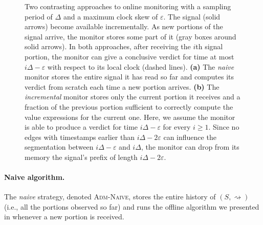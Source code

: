 \documentclass[iicol,lineno]{sn-jnl}
\renewcommand{\cref}{\Cref}
\newcommand{\hb}{\rightsquigarrow}
\newcommand{\?}{\text{?}}
\begin{document}
\begin{figure}
\begin{subfigure}[c]{.42\textwidth}
		\end{subfigure}
		\vspace{1ex}
		\caption{
			Two contrasting approaches to online monitoring with a sampling period of $\Delta$ and a maximum clock skew of $\varepsilon$. The signal (solid arrows) become available incrementally. As new portions of the signal arrive, the monitor stores some part of it (gray boxes around solid arrows). In both approaches, after receiving the $i$th signal portion, the monitor can give a conclusive verdict for time at most $i\Delta-\varepsilon$ with respect to its local clock (dashed lines).
			\textbf{(a)} The \emph{naive} monitor stores the entire signal it has read so far and computes its verdict from scratch each time a new portion arrives.
			\textbf{(b)} The \emph{incremental} monitor stores only the current portion it receives and a fraction of the previous portion sufficient to correctly compute the value expressions for the current one. Here, we assume the monitor is able to produce a verdict for time $i\Delta-\varepsilon$ for every $i \geq 1$. Since no edges with timestamps earlier than $i\Delta-2\varepsilon$ can influence the segmentation between $i\Delta-\varepsilon$ and $i\Delta$, the monitor can drop from its memory the signal's prefix of length $i\Delta-2\varepsilon$. \label{fig:online}}
	\end{figure}
	
	
	\paragraph*{Naive algorithm.}
	The \emph{naive} strategy, denoted \textsc{Adm-Naive}, stores the entire history of $(S,{\hb})$ (i.e., all the portions observed so far) and runs the offline algorithm we presented in \cref{sec:offline} whenever a new portion is received.
	
\end{document}
